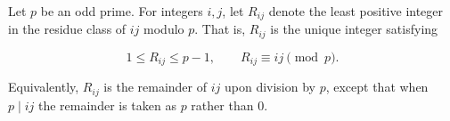 Let $p$ be an odd prime. For integers $i,j$, let $R_{ij}$ denote the least positive integer in the residue class of $ij$ modulo $p$. That is, $R_{ij}$ is the unique integer satisfying

$$1 \leq R_{ij} \leq p-1, \qquad R_{ij} \equiv ij \pmod{p}.$$

Equivalently, $R_{ij}$ is the remainder of $ij$ upon division by $p$, except that when $p \mid ij$ the remainder is taken as $p$ rather than $0$.
